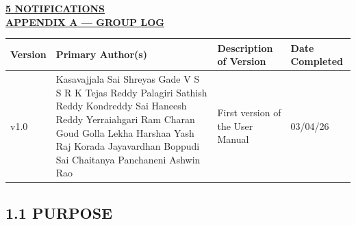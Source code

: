 \documentclass[a4paper,12pt]{article}
\newcommand{\tocmain}[3]{%
    \noindent
    \textbf{\hyperref[#3]{\color{black} #1 \quad #2}} \dotfill \textbf{\pageref{#3}} \\[0.25cm]
}
\newcommand{\sectionbar}[1]{%
    \colorbox{headergray}{%
        \makebox[\dimexpr\textwidth-2\fboxsep][c]{%
            \bfseries\textcolor{white}{\LARGE #1}%
        }%
    }%
}
\begin{document}
\tocmain{5}{NOTIFICATIONS}{sec:notifications}

\vspace{0.2cm}
\noindent\hyperref[app:group_log]{\color{black}\textbf{APPENDIX A --- GROUP LOG}} \dotfill \textbf{\pageref{app:group_log}} \\[0.2cm]

\newpage

\label{rev}
\vspace*{-1cm}
\noindent
\sectionbar{REVISIONS}

\vspace{0.6cm}

\begin{center}
\setlength{\arrayrulewidth}{1.2pt}
\renewcommand{\arraystretch}{1.5}
\begin{tabular}{|p{1.3cm}|p{5.7cm}|p{4.1cm}|p{3.2cm}|}
\hline
\rowcolor{gray!20}
\textbf{Version} & \textbf{Primary Author(s)} & \textbf{Description of Version} & \textbf{Date Completed} \\ \hline
v1.0 &
Kasavajjala Sai Shreyas \newline
Gade V S S R K Tejas Reddy \newline
Palagiri Sathish Reddy \newline
Kondreddy Sai Haneesh Reddy \newline
Yerraiahgari Ram Charan Goud \newline
Golla Lekha Harshaa \newline
Yash Raj \newline
Korada Jayavardhan \newline
Boppudi Sai Chaitanya \newline
Panchaneni Ashwin Rao
& First version of the User Manual & 03/04/26 \\ \hline
\end{tabular}
\end{center}

\newpage
{}

\label{sec:introduction}
\sectionbar{1 INTRODUCTION}

\vspace{0.6cm}

\subsection*{1.1 PURPOSE}
\label{sec:purpose}
\end{document}

